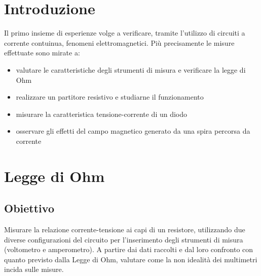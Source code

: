 \documentclass[a4paper]{article}
\begin{document}
\section{Introduzione}
Il primo insieme di esperienze volge a verificare, tramite l'utilizzo di circuiti a
corrente contuinua, fenomeni elettromagnetici. Più precisamente le misure effettuate sono mirate a:
\begin{itemize}
	\item valutare le caratteristiche degli strumenti di misura e verificare la legge di Ohm
	\item realizzare un partitore resistivo e studiarne il funzionamento
	\item misurare la caratteristica tensione-corrente di un diodo
	\item osservare gli effetti del campo magnetico generato da una spira percorsa da corrente

\end{itemize}

\section{Legge di Ohm}
\subsection{Obiettivo}
Misurare la relazione corrente-tensione ai capi di un resistore, utilizzando due diverse configurazioni del circuito per l'inserimento degli strumenti di misura
(voltometro e amperometro). A partire dai dati raccolti e dal loro confronto con quanto previsto dalla Legge di Ohm, valutare come la non idealità dei multimetri incida sulle misure.
\end{document}
